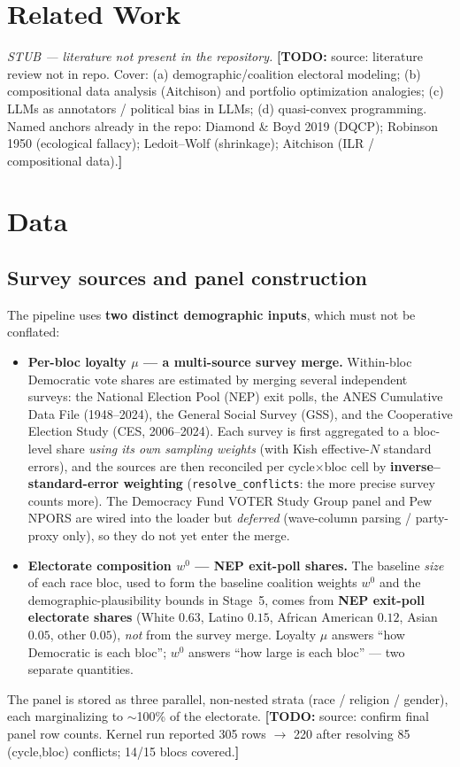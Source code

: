 \documentclass[11pt]{article}
\newcommand{\todo}[1]{{\color{red}\textbf{[TODO:} #1\textbf{]}}}
\newcommand{\stub}[1]{{\color{RoyalBlue}\emph{#1}}}
\begin{document}
\section{Related Work}
\stub{STUB --- literature not present in the repository.}
\todo{source: literature review not in repo. Cover: (a) demographic/coalition
electoral modeling; (b) compositional data analysis (Aitchison) and portfolio
optimization analogies; (c) LLMs as annotators / political bias in LLMs;
(d) quasi-convex programming. Named anchors already in the repo: Diamond \&
Boyd 2019 (DQCP); Robinson 1950 (ecological fallacy); Ledoit--Wolf (shrinkage);
Aitchison (ILR / compositional data).}

\section{Data}
\subsection{Survey sources and panel construction}
The pipeline uses \textbf{two distinct demographic inputs}, which must not be
conflated:
\begin{itemize}
  \item \textbf{Per-bloc loyalty $\mu$ --- a multi-source survey merge.}
        Within-bloc Democratic vote shares are estimated by merging several
        independent surveys: the National Election Pool (NEP) exit polls, the ANES
        Cumulative Data File (1948--2024), the General Social Survey (GSS), and the
        Cooperative Election Study (CES, 2006--2024). Each survey is first
        aggregated to a bloc-level share \emph{using its own sampling weights}
        (with Kish effective-$N$ standard errors), and the sources are then
        reconciled per cycle$\times$bloc cell by \textbf{inverse--standard-error
        weighting} (\texttt{resolve\_conflicts}: the more precise survey counts
        more). The Democracy Fund VOTER Study Group panel and Pew NPORS are wired
        into the loader but \emph{deferred} (wave-column parsing / party-proxy
        only), so they do not yet enter the merge.
  \item \textbf{Electorate composition $w^0$ --- NEP exit-poll shares.} The
        baseline \emph{size} of each race bloc, used to form the baseline coalition
        weights $w^0$ and the demographic-plausibility bounds in Stage~5, comes
        from \textbf{NEP exit-poll electorate shares} (White $0.63$, Latino
        $0.15$, African American $0.12$, Asian $0.05$, other $0.05$), \emph{not}
        from the survey merge. Loyalty $\mu$ answers ``how Democratic is each
        bloc''; $w^0$ answers ``how large is each bloc'' --- two separate
        quantities.
\end{itemize}
The panel is stored as three parallel, non-nested strata (race / religion /
gender), each marginalizing to $\sim$100\% of the electorate.
\todo{source: confirm final panel row counts. Kernel run reported 305 rows
$\rightarrow$ 220 after resolving 85 (cycle,bloc) conflicts; 14/15 blocs
covered.}
\end{document}
